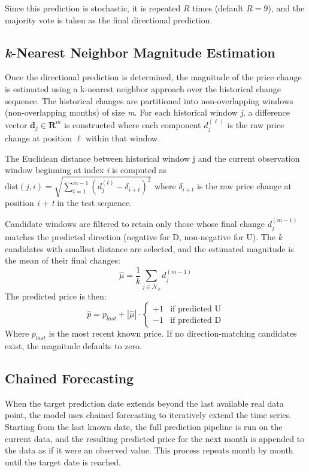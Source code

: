 \documentclass{article}
\begin{document}
Since this prediction is stochastic, it is repeated $R$ times (default $R=9$), and the majority vote is taken as the final directional prediction.
\subsection{\textit{k}-Nearest Neighbor Magnitude Estimation}
Once the directional prediction is determined, the magnitude of the price change is estimated using a k-nearest neighbor approach over the historical change sequence.  The historical changes are partitioned into  non-overlapping windows (non-overlapping months) of size \textit{m}. For each historical window \textit{j}, a difference vector 
$\mathbf{d}_j \in \mathbf{R}^m$ is constructed where each component $d_j^{(\ell)}$ is the raw price change at position $\ell$ within that window. 


The Euclidean distance between historical window j and the current observation window beginning at index \textit{i} is computed as  $\text{dist}(j, i) = \sqrt{\sum_{t=1}^{m-1} \left( d_j^{(t)} - \delta_{i+t} \right)^2}$  where $\delta_{i+t}$ is the raw price change at position \textit{i} + \textit{t} in the test sequence.

Candidate windows are filtered to retain only those whose final change $d_j^{(m-1)}$ matches the predicted direction (negative for D, non-negative for U). The \textit{k} candidates with smallest distance are selected, and the estimated magnitude is the mean of their final changes: 
\[
\hat{\mu} = \frac{1}{k} \sum_{j \in \mathcal{N}_k} d_j^{(m-1)}
\] The predicted price is then:
\[
\hat{p} = p_{last} + |\hat{\mu}| \cdot 
\begin{cases} 
+1 & \text{if predicted U} \\ 
-1 & \text{if predicted D} 
\end{cases}
\]
Where $p_{last}$ is the most recent known price. If no direction-matching candidates exist, the magnitude defaults to zero. 
\subsection{Chained Forecasting} 
When the target prediction date extends beyond the last available real data point, the model uses chained forecasting to iteratively extend the time series. Starting from the last known date, the full prediction pipeline is run on the current data, and the resulting predicted price for the next month is appended to the data as if it were an observed value. This process repeats month by month until the target date is reached. 
\end{document}
